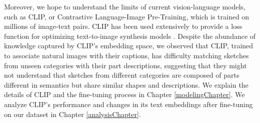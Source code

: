 Moreover, we hope to understand the limits of current vision-language models, such as CLIP, or Contrastive Language-Image Pre-Training, which is trained on millions of image-text pairs. CLIP has been used extensively to provide a loss function for optimizing text-to-image synthesis models \citep{clipDrawPaper,dalle2Paper,styleganNadaPaper,styleCLIPPaper}. Despite the abundance of knowledge captured by CLIP's embedding space, we observed that CLIP, trained to associate natural images with their captions, has difficulty matching sketches from unseen categories with their part descriptions, suggesting that they might not understand that sketches from different categories are composed of parts different in semantics but share similar shapes and descriptions. We explain the details of CLIP and the fine-tuning process in Chapter \ref{modelingChapter}. We analyze CLIP's performance and changes in its text embeddings after fine-tuning on our dataset in Chapter \ref{analysisChapter}. 


